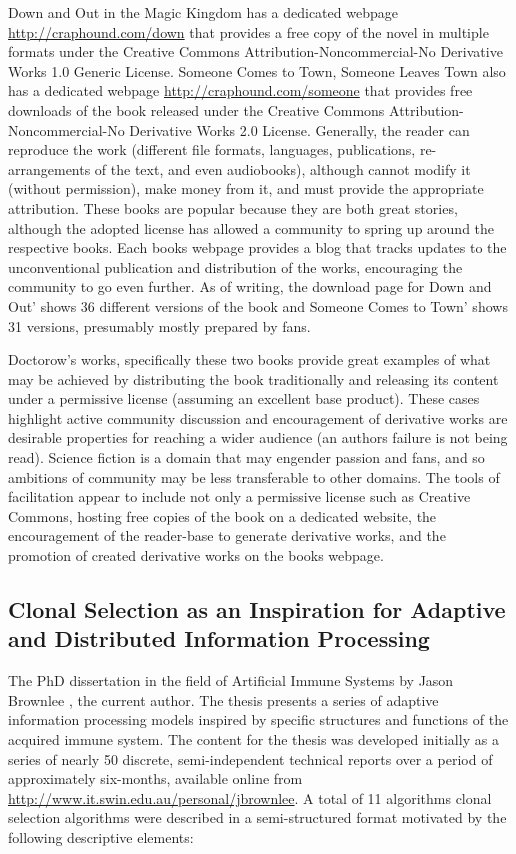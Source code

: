 \documentclass[a4paper, 11pt]{article}
\begin{document}
Down and Out in the Magic Kingdom has a dedicated webpage \url{http://craphound.com/down} that provides a free copy of the novel in multiple formats under the Creative Commons Attribution-Noncommercial-No Derivative Works 1.0 Generic License. Someone Comes to Town, Someone Leaves Town also has a dedicated webpage \url{http://craphound.com/someone} that provides free downloads of the book released under the Creative Commons Attribution-Noncommercial-No Derivative Works 2.0 License. Generally, the reader can reproduce the work (different file formats, languages, publications, re-arrangements of the text, and even audiobooks), although cannot modify it (without permission), make money from it, and must provide the appropriate attribution. These books are popular because they are both great stories, although the adopted license has allowed a community to spring up around the respective books. Each books webpage provides a blog that tracks updates to the unconventional publication and distribution of the works, encouraging the community to go even further. As of writing, the download page for Down and Out' shows 36 different versions of the book and Someone Comes to Town' shows 31 versions, presumably mostly prepared by fans.

Doctorow's works, specifically these two books provide great examples of what may be achieved by distributing the book traditionally and releasing its content under a permissive license (assuming an excellent base product). These cases highlight active community discussion and encouragement of derivative works are desirable properties for reaching a wider audience (an authors failure is not being read). Science fiction is a domain that may engender passion and fans, and so ambitions of community may be less transferable to other domains. The tools of facilitation appear to include not only a permissive license such as Creative Commons, hosting free copies of the book on a dedicated website, the encouragement of the reader-base to generate derivative works, and the promotion of created derivative works on the books webpage.

% 
% 
\subsection{Clonal Selection as an Inspiration for Adaptive and Distributed Information Processing}
The PhD dissertation in the field of Artificial Immune Systems by Jason Brownlee \cite{Brownlee2008}, the current author. The thesis presents a series of adaptive information processing models inspired by specific structures and functions of the acquired immune system. The content for the thesis was developed initially as a series of nearly 50 discrete, semi-independent technical reports over a period of approximately six-months, available online from \url{http://www.it.swin.edu.au/personal/jbrownlee}. A total of 11 algorithms clonal selection algorithms were described in a semi-structured format motivated by the following descriptive elements:
\end{document}
